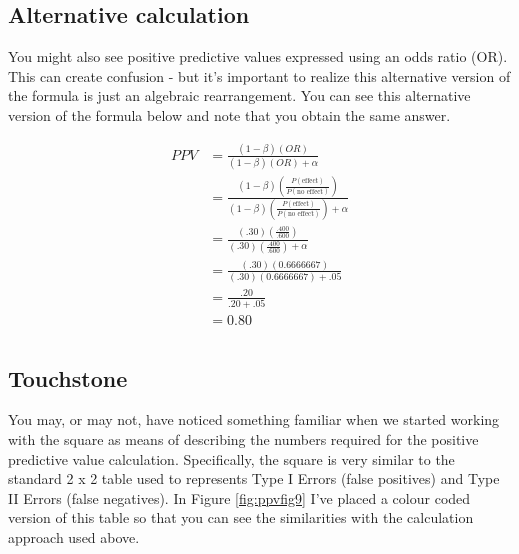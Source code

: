 \documentclass[
]{krantz}
\begin{document}
\hypertarget{alternative-calculation}{%
\subsection{Alternative calculation}\label{alternative-calculation}}

You might also see positive predictive values expressed using an odds ratio (OR). This can create confusion - but it's important to realize this alternative version of the formula is just an algebraic rearrangement. You can see this alternative version of the formula below and note that you obtain the same answer.

\[
\begin{aligned}
PPV &= \frac{(1 - \beta)(OR)}{(1 - \beta)(OR) + \alpha}\\
&= \frac{(1 - \beta)(\frac{P(\text{effect})}{P(\text{no effect})})}{(1 - \beta)(\frac{P(\text{effect})}{P(\text{no effect})}) + \alpha}\\
&= \frac{(.30)(\frac{.400}{.600})}{(.30)(\frac{.400}{.600}) + \alpha}\\
&= \frac{(.30)(0.6666667)}{(.30)(0.6666667) + .05}\\
&= \frac{.20}{.20 + .05}\\
&= 0.80\\
\end{aligned}
\]

\hypertarget{touchstone}{%
\subsection{Touchstone}\label{touchstone}}

You may, or may not, have noticed something familiar when we started working with the square as means of describing the numbers required for the positive predictive value calculation. Specifically, the square is very similar to the standard 2 x 2 table used to represents Type I Errors (false positives) and Type II Errors (false negatives). In Figure \ref{fig:ppvfig9} I've placed a colour coded version of this table so that you can see the similarities with the calculation approach used above.
\end{document}
